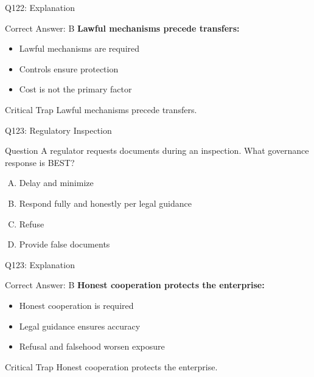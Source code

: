 \documentclass{beamer}
\begin{document}
	\begin{frame}{Q122: Explanation}
		\begin{block}{Correct Answer: B}
			\textbf{Lawful mechanisms precede transfers:}
			\begin{itemize}
				\item Lawful mechanisms are required
				\item Controls ensure protection
				\item Cost is not the primary factor
			\end{itemize}
		\end{block}
		\begin{alertblock}{Critical Trap}
			Lawful mechanisms precede transfers.
		\end{alertblock}
	\end{frame}
	
	\begin{frame}{Q123: Regulatory Inspection}
		\begin{block}{Question}
			A regulator requests documents during an inspection. What governance response is BEST?
		\end{block}
		\begin{enumerate}[(A)]
			\item Delay and minimize
			\item Respond fully and honestly per legal guidance
			\item Refuse
			\item Provide false documents
		\end{enumerate}
	\end{frame}
	
	\begin{frame}{Q123: Explanation}
		\begin{block}{Correct Answer: B}
			\textbf{Honest cooperation protects the enterprise:}
			\begin{itemize}
				\item Honest cooperation is required
				\item Legal guidance ensures accuracy
				\item Refusal and falsehood worsen exposure
			\end{itemize}
		\end{block}
		\begin{alertblock}{Critical Trap}
			Honest cooperation protects the enterprise.
		\end{alertblock}
	\end{frame}
	
\end{document}
